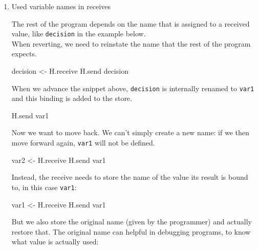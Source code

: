 \documentclass[runningheads,plain]{llncs}
\newenvironment{Shaded}{}{}
\newcommand{\OtherTok}[1]{\textcolor[rgb]{0.00,0.44,0.13}{#1}}
\newcommand{\NormalTok}[1]{#1}
\begin{document}
\begin{enumerate}
\def\labelenumi{\arabic{enumi}.}
\item
  Used variable names in receives

  The rest of the program depends on the name that is assigned to a
  received value, like \texttt{decision} in the example below.\\
  When reverting, we need to reinstate the name that the rest of the
  program expects.

\begin{Shaded}
\begin{Highlighting}[]
\NormalTok{decision }\OtherTok{<-}\NormalTok{ H.receive    }
\NormalTok{H.send decision          }
\end{Highlighting}
\end{Shaded}

  When we advance the snippet above, \texttt{decision} is internally
  renamed to \texttt{var1} and this binding is added to the store.

\begin{Shaded}
\begin{Highlighting}[]
\NormalTok{H.send var1        }
\end{Highlighting}
\end{Shaded}

  Now we want to move back. We can't simply create a new name: if we
  then move forward again, \texttt{var1} will not be defined.

\begin{Shaded}
\begin{Highlighting}[]
\NormalTok{var2 }\OtherTok{<-}\NormalTok{ H.receive       }
\NormalTok{H.send var1             }
\end{Highlighting}
\end{Shaded}

  Instead, the receive needs to store the name of the value its result
  is bound to, in this case \texttt{var1}:

\begin{Shaded}
\begin{Highlighting}[]
\NormalTok{var1 }\OtherTok{<-}\NormalTok{ H.receive}
\NormalTok{H.send var1}
\end{Highlighting}
\end{Shaded}

  But we also store the original name (given by the programmer) and
  actually restore that. The original name can helpful in debugging
  programs, to know what value is actually used:


\end{enumerate}
\end{document}
